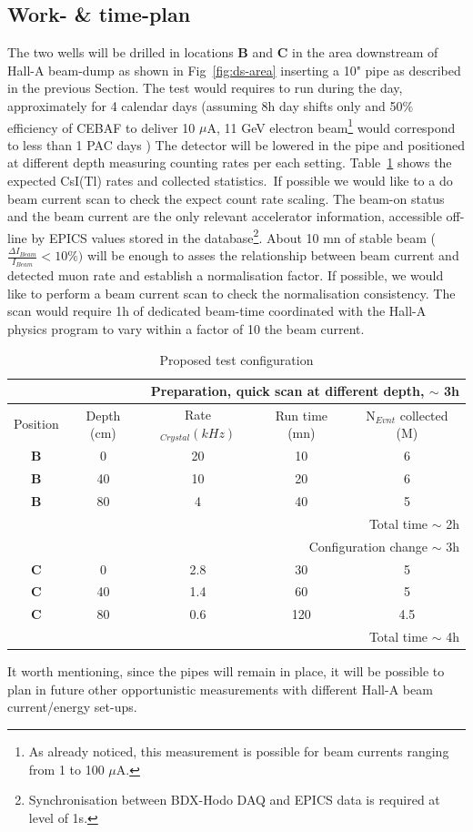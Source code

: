 \subsection{Work- \& time-plan}
The two wells  will be drilled in locations {\bf B} and {\bf C} in the area downstream of Hall-A beam-dump as shown in Fig~\ref{fig:ds-area} inserting a 10" pipe as described in the previous Section. The test would requires to run during the day, approximately for 4 calendar  days (assuming 8h day shifts only and  50$\%$ efficiency of CEBAF to deliver 10 $\mu$A,  11 GeV electron beam\footnote{As already noticed, this measurement is possible for beam currents ranging from 1 to 100  $\mu$A.} would correspond to less than 1 PAC days )
The detector will be lowered in the pipe and positioned at different depth measuring counting rates per each setting. Table~\ref{tab:test} shows the expected CsI(Tl) rates and collected statistics.\
If possible  we would like to a do beam current scan to check the expect count rate scaling.
The beam-on status and the beam current are the only 
relevant accelerator information,  accessible off-line by  EPICS values stored in the  database\footnote{Synchronisation between BDX-Hodo DAQ and EPICS data  is required  at level of 1s.}. About 10 mn of stable beam ($\frac{\Delta I_{Beam}}{I_{Beam}}<10\%)$ will  be enough to asses the relationship between beam current and detected muon rate and establish a normalisation factor. If possible, we would  like to  perform a  beam current scan to check the normalisation consistency. The scan  would require 1h of dedicated beam-time  coordinated with the Hall-A physics program to vary within   a factor of 10 the beam current.
 \begin{table}[htp]
\caption{Proposed test configuration}
\begin{center}
\begin{tabular}{|c|c|c|c|c|}
\hline\hline
\multicolumn{5}{r}{Preparation, quick scan at different depth,   $\sim$ 3h } \\
\hline
Position  &Depth  (cm)& Rate$_{Crystal} (kHz)$  &Run time (mn) & N$_{Evnt}$ collected (M)  \\
\hline\hline
 {\bf B} & 0 &  20 & 10 & 6\\
 \hline
 {\bf B}  & 40 &  10 & 20 & 6 \\
 \hline
 {\bf B}  & 80 &  4 & 40 & 5\\
 \hline
\multicolumn{5}{|r|}{Total time    $\sim$ 2h }\\
 \hline\hline
\multicolumn{5}{r}{Configuration change  $\sim$ 3h } \\
 \hline\hline
 {\bf C} & 0 &  2.8 & 30 & 5\\
 \hline
 {\bf C}  & 40 &  1.4 & 60 & 5 \\
 \hline
 {\bf C}  & 80 &  0.6 & 120 &4.5\\
 \hline
\multicolumn{5}{|r|}{Total time    $\sim$ 4h }\\
 \hline\hline
\end{tabular}
\end{center}
\label{tab:test}
\end{table}
It worth mentioning, since the pipes will remain in place, it will be possible to plan in future  other opportunistic measurements with different Hall-A beam current/energy  set-ups.

